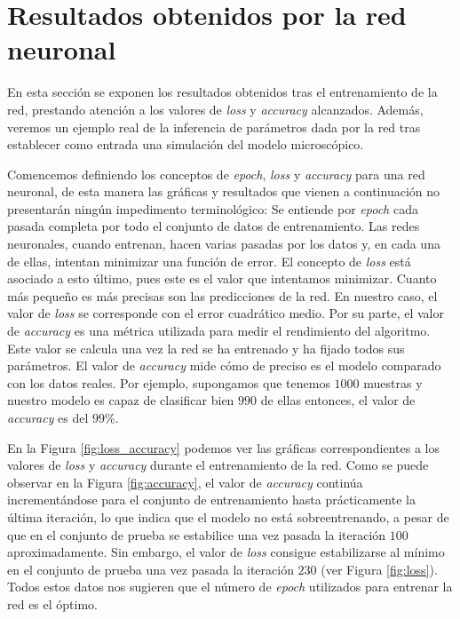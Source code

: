 \section{Resultados obtenidos por la red neuronal}

En esta sección se exponen los resultados obtenidos tras el entrenamiento de la red, prestando atención a los valores de \textit{loss} y \textit{accuracy} alcanzados. Además, veremos un ejemplo real de la inferencia de parámetros dada por la red tras establecer como entrada una simulación del modelo microscópico. 

Comencemos definiendo los conceptos de \textit{epoch}, \textit{loss} y \textit{accuracy} para una red neuronal, de esta manera las gráficas y resultados que vienen a continuación no presentarán ningún impedimento terminológico: Se entiende por \textit{epoch} cada pasada completa por todo el conjunto de datos de entrenamiento. Las redes neuronales, cuando entrenan, hacen varias pasadas por los datos y, en cada una de ellas, intentan minimizar una función de error. El concepto de \textit{loss} está asociado a esto último, pues este es el valor que intentamos minimizar. Cuanto más pequeño es más precisas son las predicciones de la red. En nuestro caso, el valor de \textit{loss} se corresponde con el error cuadrático medio. Por su parte, el valor de \textit{accuracy} es una métrica utilizada para medir el rendimiento del algoritmo. Este valor se calcula una vez la red se ha entrenado y ha fijado todos sus parámetros. El valor de \textit{accuracy} mide cómo de preciso es el modelo comparado con los datos reales. Por ejemplo, supongamos que tenemos $1000$ muestras y nuestro modelo es capaz de clasificar bien $990$ de ellas entonces, el valor de \textit{accuracy} es del $99\%$.

En la Figura \ref{fig:loss_accuracy} podemos ver las gráficas correspondientes a los valores de \textit{loss} y \textit{accuracy} durante el entrenamiento de la red. Como se puede observar en la Figura \ref{fig:accuracy}, el valor de \textit{accuracy} continúa incrementándose para el conjunto de entrenamiento hasta prácticamente la última iteración, lo que indica que el modelo no está sobreentrenando, a pesar de que en el conjunto de prueba se estabilice una vez pasada la iteración $100$ aproximadamente. Sin embargo, el valor de \textit{loss} consigue estabilizarse al mínimo en el conjunto de prueba una vez pasada la iteración $230$ (ver Figura \ref{fig:loss}). Todos estos datos nos sugieren que el número de \textit{epoch} utilizados para entrenar la red es el óptimo.


